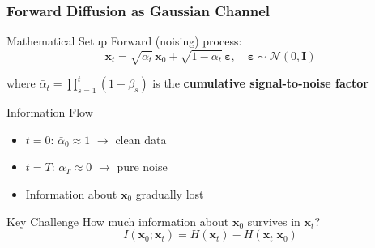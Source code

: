 \documentclass[aspectratio=169]{beamer}
\begin{document}
\begin{frame}
\frametitle{Forward Diffusion as Gaussian Channel}
\begin{block}{Mathematical Setup}
Forward (noising) process:
\begin{equation}
\mathbf{x}_t = \sqrt{\bar{\alpha}_t}\,\mathbf{x}_0 + \sqrt{1-\bar{\alpha}_t}\,\boldsymbol{\varepsilon}, \quad \boldsymbol{\varepsilon} \sim \mathcal{N}(0,\mathbf{I})
\end{equation}

where $\bar{\alpha}_t = \prod_{s=1}^{t}(1-\beta_s)$ is the \textbf{cumulative signal-to-noise factor}
\end{block}

\begin{block}{Information Flow}
\begin{itemize}
\item $t=0$: $\bar{\alpha}_0 \approx 1$ $\rightarrow$ clean data
\item $t=T$: $\bar{\alpha}_T \approx 0$ $\rightarrow$ pure noise
\item Information about $\mathbf{x}_0$ gradually lost
\end{itemize}
\end{block}

\begin{block}{Key Challenge}
How much information about $\mathbf{x}_0$ survives in $\mathbf{x}_t$?
\begin{equation}
I(\mathbf{x}_0; \mathbf{x}_t) = H(\mathbf{x}_t) - H(\mathbf{x}_t|\mathbf{x}_0)
\end{equation}
\end{block}
\end{frame}
\end{document}
